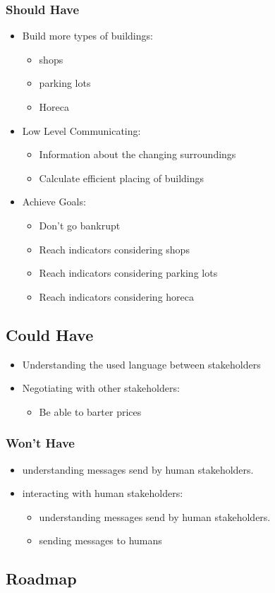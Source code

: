 \subsubsection{Should Have}
\begin{itemize}
	\item Build more types of buildings:
	\begin{itemize}
		\item shops
		\item parking lots
		\item Horeca
	\end{itemize}
	\item Low Level Communicating:
	\begin{itemize}
		\item Information about the changing surroundings
		\item Calculate efficient placing of buildings
	\end{itemize}
	\item Achieve Goals:
	\begin{itemize}
		\item Don’t go bankrupt
		\item Reach indicators considering shops
		\item Reach indicators considering parking lots
		\item Reach indicators considering horeca
	\end{itemize}
\end{itemize}

\subsection{Could Have}
\begin{itemize}
	\item Understanding the used language between stakeholders
	\item Negotiating with other stakeholders:
	\begin{itemize}
		\item Be able to barter prices
	\end{itemize}
\end{itemize}

\subsubsection{Won’t Have}
\begin{itemize}
	\item understanding messages send by human stakeholders.
	\item interacting with human stakeholders:
	\begin{itemize}
		\item understanding messages send by human stakeholders.
		\item sending messages to humans
	\end{itemize}
\end{itemize}

\subsection{Roadmap}

\newpage
